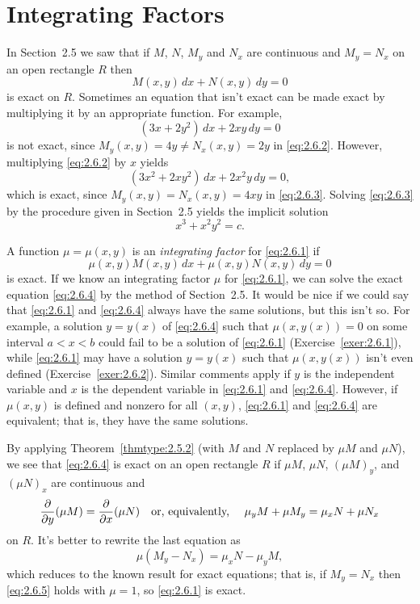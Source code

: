 \section{Integrating Factors}

\noindent
In Section~2.5 we saw that if $M$, $N$, $M_{y}$ and $N_{x}$ are continuous and $M_{y}=N_{x}$ on an
open rectangle $R$ then
\begin{equation}
  \label{eq:2.6.1}M(x,y)\,dx+N(x,y)\,dy=0
\end{equation}
is exact on $R$. Sometimes an equation that isn't exact can be made exact by multiplying it by an
appropriate function. For example,
\begin{equation}
  \label{eq:2.6.2}(3x+2y^{2})\,dx+2xy\,dy=0
\end{equation}
is not exact, since $M_{y}(x,y)=4y\ne N_{x}(x,y)=2y$ in \eqref{eq:2.6.2}. However, multiplying
\eqref{eq:2.6.2} by $x$ yields
\begin{equation}
  \label{eq:2.6.3}(3x^{2}+2xy^{2})\,dx+2x^{2}y\,dy=0,
\end{equation}
which is exact, since $M_{y}(x,y)=N_{x}(x,y)=4xy$ in \eqref{eq:2.6.3}. Solving \eqref{eq:2.6.3} by
the procedure given in Section~2.5 yields the implicit solution
\[
  x^{3}+x^{2}y^{2}=c.
\]

A function $\mu=\mu(x,y)$ is an {\color{blue}\it integrating factor} for \eqref{eq:2.6.1} if
\begin{equation}
  \label{eq:2.6.4}\mu(x,y)M(x,y)\,dx+\mu(x,y)N(x,y)\,dy=0
\end{equation}
is exact. If we know an integrating factor $\mu$ for \eqref{eq:2.6.1}, we can solve the exact
equation \eqref{eq:2.6.4} by the method of Section~2.5. It would be nice if we could say that
\eqref{eq:2.6.1} and \eqref{eq:2.6.4} always have the same solutions, but this isn't so. For
example, a solution $y=y(x)$ of \eqref{eq:2.6.4} such that $\mu(x,y(x))=0$ on some interval $a<x<b$
could fail to be a solution of \eqref{eq:2.6.1} (Exercise~\ref{exer:2.6.1}), while \eqref{eq:2.6.1}
may have a solution $y=y(x)$ such that $\mu(x,y(x))$ isn't even defined (Exercise~\ref{exer:2.6.2}).
Similar comments apply if $y$ is the independent variable and $x$ is the dependent variable in
\eqref{eq:2.6.1} and \eqref{eq:2.6.4}. However, if $\mu(x,y)$ is defined and nonzero for all
$(x,y)$, \eqref{eq:2.6.1} and \eqref{eq:2.6.4} are equivalent; that is, they have the same
solutions.


\noindent
By applying Theorem~\ref{thmtype:2.5.2} (with $M$ and $N$ replaced by $\mu M$ and $\mu N$), we see
that \eqref{eq:2.6.4} is exact on an open rectangle $R$ if $\mu M$, $\mu N$, $(\mu M)_{y}$, and
$(\mu N)_{x}$ are continuous and
\[
  \frac{\partial}{\partial y}(\mu M)=\frac{\partial}{\partial x}(\mu N)\mbox{\quad or, equivalently, \quad}\mu_{y}M+\mu M_{y}=\mu_{x}N+\mu N_{x}
\]
on $R$. It's better to rewrite the last equation as
\begin{equation}
  \label{eq:2.6.5}\mu(M_{y}-N_{x})=\mu_{x}N-\mu_{y}M,
\end{equation}
which reduces to the known result for exact equations; that is, if $M_{y}=N_{x}$ then
\eqref{eq:2.6.5} holds with $\mu=1$, so \eqref{eq:2.6.1} is exact.

